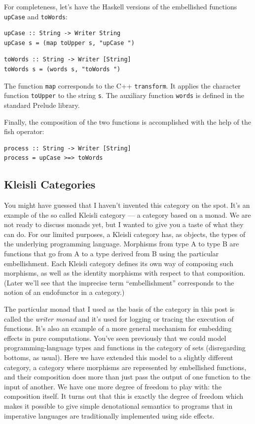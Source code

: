 For completeness, let's have the Haskell versions of the embellished
functions \texttt{upCase} and \texttt{toWords}:

\begin{verbatim}
upCase :: String -> Writer String
upCase s = (map toUpper s, "upCase ")
\end{verbatim}

\begin{verbatim}
toWords :: String -> Writer [String]
toWords s = (words s, "toWords ")
\end{verbatim}

The function \texttt{map} corresponds to the C++ \texttt{transform}. It
applies the character function \texttt{toUpper} to the string
\texttt{s}. The auxiliary function \texttt{words} is defined in the
standard Prelude library.

Finally, the composition of the two functions is accomplished with the
help of the fish operator:

\begin{verbatim}
process :: String -> Writer [String]
process = upCase >=> toWords
\end{verbatim}

\subsection{Kleisli Categories}\label{kleisli-categories}

You might have guessed that I haven't invented this category on the
spot. It's an example of the so called Kleisli category --- a category
based on a monad. We are not ready to discuss monads yet, but I wanted
to give you a taste of what they can do. For our limited purposes, a
Kleisli category has, as objects, the types of the underlying
programming language. Morphisms from type A to type B are functions that
go from A to a type derived from B using the particular embellishment.
Each Kleisli category defines its own way of composing such morphisms,
as well as the identity morphisms with respect to that composition.
(Later we'll see that the imprecise term ``embellishment'' corresponds
to the notion of an endofunctor in a category.)

The particular monad that I used as the basis of the category in this
post is called the \emph{writer monad} and it's used for logging or
tracing the execution of functions. It's also an example of a more
general mechanism for embedding effects in pure computations. You've
seen previously that we could model programming-language types and
functions in the category of sets (disregarding bottoms, as usual). Here
we have extended this model to a slightly different category, a category
where morphisms are represented by embellished functions, and their
composition does more than just pass the output of one function to the
input of another. We have one more degree of freedom to play with: the
composition itself. It turns out that this is exactly the degree of
freedom which makes it possible to give simple denotational semantics to
programs that in imperative languages are traditionally implemented
using side effects.

